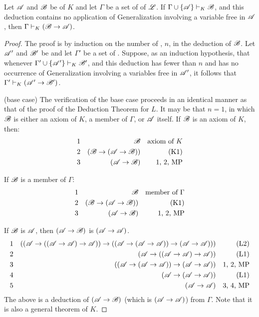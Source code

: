 \setcounter{definition}{7}
\begin{proposition}
  Let \(\mathscr{A}\) and \(\mathscr{B}\) be \wfs{} of \(K\) and let \(\Gamma\) be a set of \wfs{} of \(\mathscr{L}\). If \(\Gamma \cup \{\mathscr{A}\} \vdash_{K} \mathscr{B}\), and this deduction contains no application of Generalization involving a variable free in \(\mathscr{A}\), then \(\Gamma \vdash_{K} (\mathscr{B} \rightarrow \mathscr{A})\).

  \begin{proof}
    The proof is by induction on the number of \wfs{}, \(n\), in the deduction of \(\mathscr{B}\). Let \(\mathscr{A}'\) and \(\mathscr{B}'\) be \wfs{} and let \(\Gamma'\) be a set of \wfs{}. Suppose, as an induction hypothesis, that whenever \(\Gamma' \cup \{\mathscr{A}'\} \vdash_{K} \mathscr{B}'\), and this deduction has fewer than \(n\) \wfs{} and has no occurrence of Generalization involving a variables free in \(\mathscr{A}'\), it follows that \(\Gamma' \vdash_{K} (\mathscr{A}' \rightarrow \mathscr{B}')\).

    (base case) The verification of the base case proceeds in an identical manner as that of the proof of the Deduction Theorem for \(L\). It may be that \(n = 1\), in which \(\mathscr{B}\) is either an axiom of \(K\), a member of \(\Gamma\), or \(\mathscr{A}\) itself. If \(\mathscr{B}\) is an axiom of \(K\), then:
    \begin{align*}
      \text{1}&&
      \mathscr{B}&&
      \text{axiom of \(K\)}\\
      \text{2}&&
      (\mathscr{B} \rightarrow (\mathscr{A} \rightarrow \mathscr{B}))&&
      \text{(K1)}\\
      \text{3}&&
      (\mathscr{A} \rightarrow \mathscr{B})&&
      \text{1, 2, MP}
    \end{align*}

    If \(\mathscr{B}\) is a member of \(\Gamma\):
    \begin{align*}
      \text{1}&&
      \mathscr{B}&&
      \text{member of \(\Gamma\)}\\
      \text{2}&&
      (\mathscr{B} \rightarrow (\mathscr{A} \rightarrow \mathscr{B}))&&
      \text{(K1)}\\
      \text{3}&&
      (\mathscr{A} \rightarrow \mathscr{B})&&
      \text{1, 2, MP}
    \end{align*}

      If \(\mathscr{B}\) is \(\mathscr{A}\), then \((\mathscr{A} \rightarrow \mathscr{B})\) is \((\mathscr{A} \rightarrow \mathscr{A})\).
        \begin{align*}
          \text{1}&&
          ((\mathscr{A} \rightarrow ((\mathscr{A} \rightarrow \mathscr{A}) \rightarrow \mathscr{A})) \rightarrow ((\mathscr{A} \rightarrow (\mathscr{A} \rightarrow \mathscr{A})) \rightarrow (\mathscr{A} \rightarrow \mathscr{A})))&&
          \text{(L2)}\\
          \text{2}&&
          (\mathscr{A} \rightarrow ((\mathscr{A} \rightarrow \mathscr{A}) \rightarrow \mathscr{A}))&&
          \text{(L1)}\\
          \text{3}&&
          ((\mathscr{A} \rightarrow (\mathscr{A} \rightarrow \mathscr{A})) \rightarrow (\mathscr{A} \rightarrow \mathscr{A}))&&
          \text{1, 2, MP}\\
          \text{4}&&
          (\mathscr{A} \rightarrow (\mathscr{A} \rightarrow \mathscr{A}))&&
          \text{(L1)}\\
          \text{5}&&
          (\mathscr{A} \rightarrow \mathscr{A})&&
          \text{3, 4, MP}
        \end{align*}
        The above is a deduction of \((\mathscr{A} \rightarrow \mathscr{B})\) (which is \((\mathscr{A} \rightarrow \mathscr{A})\)) from \(\Gamma\). Note that it is also a general theorem of \(K\).


\end{proof}
\end{proposition}
